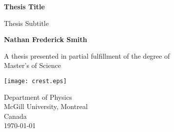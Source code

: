 \begin{titlepage}
    \begin{center}
        \vspace*{1cm}
        
        \Huge
        \textbf{
            Thesis Title
        }
        
        \vspace{0.5cm}
        \LARGE
        Thesis Subtitle
        
        \vspace{1.5cm}
        \Large 
        \textbf{Nathan Frederick Smith}
        
        \vfill

        \Large
        A thesis presented in partial fulfillment of the degree of\\
        Master's of Science
        
        \vspace{0.8cm}
        
        \texttt{[image: crest.eps]}
        
        \Large
        Department of Physics\\
        McGill University, Montreal\\
        Canada\\
        \today
        
    \end{center}
\end{titlepage}

